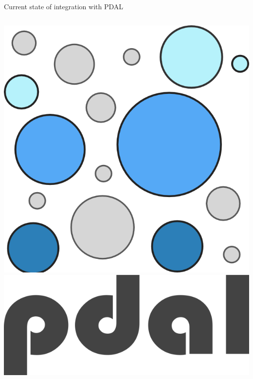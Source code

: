 \documentclass[xcolor={dvipsnames,usenames},beamer,aspectratio=169]{beamer}
\begin{document}
\begin{frame}{Current state of integration with PDAL}
\begin{columns}
\begin{column}{0.25\textwidth}
\begin{center}
  \includegraphics[width=\textwidth]{logos/pdal_bubbles}\\
  \includegraphics[width=\textwidth]{logos/pdal_text}
\end{center}

\end{column}
\end{columns}

\end{frame}
\end{document}
